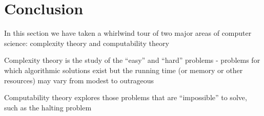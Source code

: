 \documentclass[8pt,a4paper,compress]{beamer}
\begin{document}
\section{Conclusion}
\begin{frame}[fragile]
\pause

In this section we have taken a whirlwind tour of two major areas of computer science: complexity theory and computability theory

\pause
\bigskip

Complexity theory is the study of the ``easy'' and ``hard'' problems - problems for which algorithmic solutions exist but the running time (or memory or other resources) may vary from modest to outrageous

\pause
\bigskip

Computability theory explores those problems that are ``impossible'' to solve, such as the halting problem
\end{frame}
\end{document}
